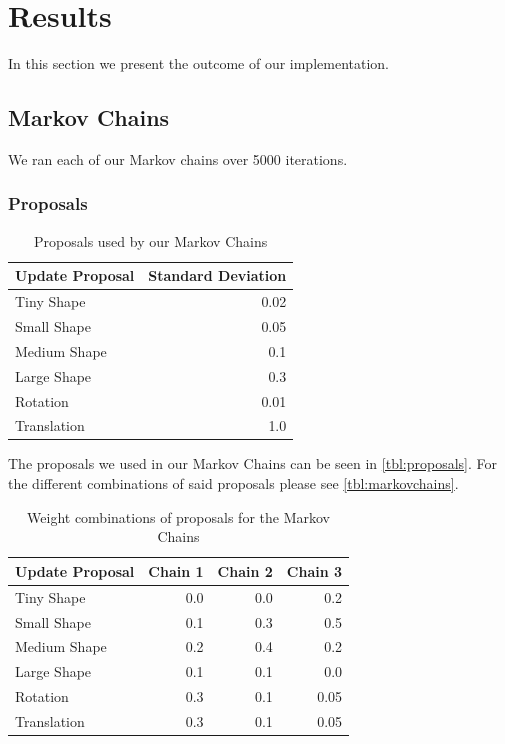 \section{Results}
\label{sec:results}

In this section we present the outcome of our implementation.




\subsection{Markov Chains}
\label{subsec:markovchains}
We ran each of our Markov chains over 5000 iterations.


\subsubsection{Proposals}
\label{subsec:proposals}

\begin{table}
  \centering
  \caption{Proposals used by our Markov Chains}
  \label{tbl:proposals}
  \begin{tabular}{lr}
    \toprule
      \textbf{Update Proposal} &
      Standard Deviation \\
    \midrule
      Tiny Shape & 0.02 \\
      Small Shape & 0.05 \\
      Medium Shape & 0.1 \\
      Large Shape & 0.3 \\
      Rotation & 0.01 \\
      Translation & 1.0 \\
    \bottomrule
  \end{tabular}
\end{table}

The proposals we used in our Markov Chains can be seen in \autoref{tbl:proposals}. For the different combinations of said proposals  please see \autoref{tbl:markovchains}.

\begin{table}
  \centering
  \caption{Weight combinations of proposals for the Markov Chains}
  \label{tbl:markovchains}
  \begin{tabular}{lrrr}
    \toprule
      \textbf{Update Proposal} &
      Chain 1 &
      Chain 2 &
      Chain 3 \\
    \midrule
      Tiny Shape & 0.0 & 0.0 & 0.2 \\
      Small Shape & 0.1 & 0.3 & 0.5 \\
      Medium Shape & 0.2 & 0.4 & 0.2 \\
      Large Shape & 0.1 & 0.1 & 0.0 \\
      Rotation & 0.3 & 0.1 & 0.05 \\
      Translation & 0.3 & 0.1 & 0.05 \\
    \bottomrule
  \end{tabular}
\end{table}

